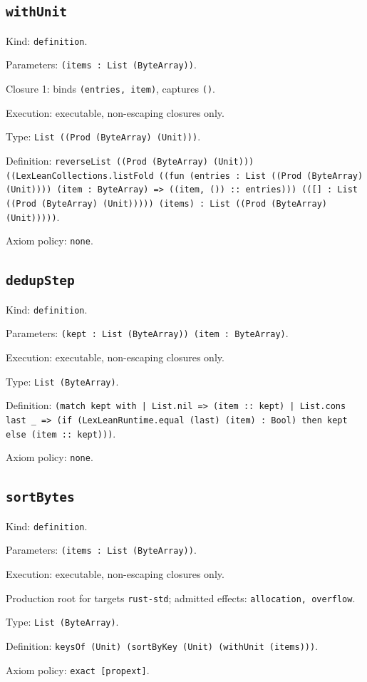 \documentclass[11pt]{article}
\begin{document}
\subsection*{\texttt{withUnit}}
\noindent Kind: \texttt{definition}.\par
\noindent Parameters: \texttt{(items : List (ByteArray))}.\par
\noindent Closure 1: binds \texttt{(entries, item)}, captures \texttt{()}.\par
\noindent Execution: executable, non-escaping closures only.\par
\noindent Type: \texttt{List ((Prod (ByteArray) (Unit)))}.\par
\noindent Definition: \texttt{reverseList ((Prod (ByteArray) (Unit))) ((LexLeanCollections.listFold ((fun (entries : List ((Prod (ByteArray) (Unit)))) (item : ByteArray) => ((item, ()) :: entries))) (([] : List ((Prod (ByteArray) (Unit))))) (items) : List ((Prod (ByteArray) (Unit)))))}.\par
\noindent Axiom policy: \texttt{none}.\par
\subsection*{\texttt{dedupStep}}
\noindent Kind: \texttt{definition}.\par
\noindent Parameters: \texttt{(kept : List (ByteArray)) (item : ByteArray)}.\par
\noindent Execution: executable, non-escaping closures only.\par
\noindent Type: \texttt{List (ByteArray)}.\par
\noindent Definition: \texttt{(match kept with | List.nil => (item :: kept) | List.cons last \_ => (if (LexLeanRuntime.equal (last) (item) : Bool) then kept else (item :: kept)))}.\par
\noindent Axiom policy: \texttt{none}.\par
\subsection*{\texttt{sortBytes}}
\noindent Kind: \texttt{definition}.\par
\noindent Parameters: \texttt{(items : List (ByteArray))}.\par
\noindent Execution: executable, non-escaping closures only.\par
\noindent Production root for targets \texttt{rust-std}; admitted effects: \texttt{allocation, overflow}.\par
\noindent Type: \texttt{List (ByteArray)}.\par
\noindent Definition: \texttt{keysOf (Unit) (sortByKey (Unit) (withUnit (items)))}.\par
\noindent Axiom policy: \texttt{exact [propext]}.\par
\end{document}
